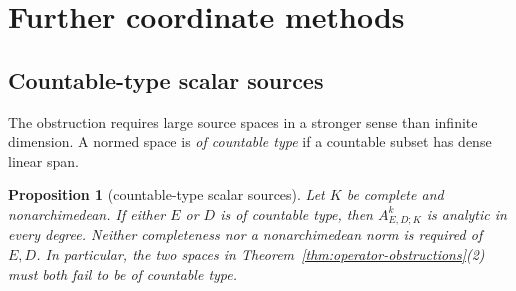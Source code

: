 \documentclass[11pt]{amsart}
\newtheorem{proposition}[theorem]{Proposition}
\theoremstyle{definition}
\theoremstyle{remark}
\numberwithin{equation}{section}
\begin{document}
\section{Further coordinate methods}\label{app:coordinate-methods}
\subsection{Countable-type scalar sources}
The obstruction requires large source spaces in a stronger sense than infinite dimension.
A normed space is \emph{of countable type} if a countable subset has dense linear span.

\begin{proposition}[countable-type scalar sources]\label{prop:scalar-countable}
Let $K$ be complete and nonarchimedean. If either $E$ or $D$ is of countable type, then
$A^k_{E,D;K}$ is analytic in every degree. Neither completeness nor a nonarchimedean norm
is required of $E,D$. In particular, the two spaces in
Theorem~\ref{thm:operator-obstructions}(2) must both fail to be of countable type.
\end{proposition}
\end{document}
